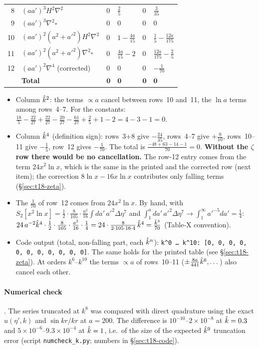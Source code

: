 {\begin{longtable}{@{}r l l l l l@{}}
8 & $(aa')^3H^2\nabla^2$ & 0 & $\tfrac25$ & 0 & $\tfrac3{35}$\\[2pt]
9 & $(aa')^3\nabla^2\square$ & 0 & 0 & 0 & 0\\
10 & $(aa')^2(a^2{+}a'^2)H^2\nabla^2$ & 0 & $1-\tfrac{4a}{15}$ & 0 & $\tfrac15-\tfrac{12a}{175}$\\[2pt]
11 & $(aa')^2(a^2{+}a'^2)\nabla^2\square$ & 0 & $\tfrac{4a}{15}-2$ & 0 & $\tfrac{12a}{175}-\tfrac25$\\[2pt]
12 & $(aa')^2\nabla^4$ (corrected) & 0 & 0 & 0 & $-\tfrac1{70}$\\
\midrule
 & \textbf{Total} & $\bm0$ & $\bm0$ & $\bm0$ & $\bm0$\\
\bottomrule
\end{longtable}
}
\begin{itemize}[leftmargin=14pt]
\item Column $\hat k^2$: the terms $\propto a$ cancel between rows~10 and~11, the $\ln a$ terms among rows~4--7. For the constants:
$\tfrac{18}5-\tfrac{22}{27}+\tfrac{22}{27}-\tfrac{20}{27}-\tfrac{61}{27}+\tfrac25+1-2=4-3-1=0$.
\item Column $\hat k^4$ (definition sign): rows~3+8 give $-\tfrac{24}{35}$, rows~4--7 give $+\tfrac{9}{10}$, rows~10--11 give $-\tfrac15$, row~12 gives $-\tfrac1{70}$.
The total is $\tfrac{-48+63-14-1}{70}=0$. \textbf{Without the $\zeta$ row there would be no cancellation.} The row-12 entry comes from the term
$24x^2\ln x$, which is the same in the printed and the corrected row (next item); the correction $8\ln x-16x\ln x$ contributes only falling terms (\S\ref{sec:t18-zeta}).
\item The $\tfrac1{70}$ of row~12 comes from $24x^2\ln x$. By hand, with $S_2[x^2\ln x]=\tfrac12\cdot\tfrac8{105}\cdot\tfrac{a^2}{16}\int da'\,a'^2\Delta\eta^7$ and
$\int_1^a da'\,a'^2\Delta\eta^7\to\int_1^\infty a'^{-5}da'=\tfrac14$:
$24\,a^{-2}\hat k^4\cdot\tfrac12\cdot\tfrac8{105}\cdot\tfrac{a^2}{16}\cdot\tfrac14=24\cdot\tfrac{8}{2\cdot105\cdot16\cdot4}\,\hat k^4=\tfrac{\hat k^4}{70}$ (Table-X convention).
\item Code output (total, non-falling part, each $\hat k^n$): \texttt{k\^{}0 \ldots{} k\^{}10: [0, 0, 0, 0, 0, 0, 0, 0, 0, 0, 0]}. The same holds for the printed table (see \S\ref{sec:t18-zeta}).
At orders $k^6$--$k^{10}$ the terms $\propto a$ of rows~10--11 ($\pm\frac{8a}{441}\hat k^6,\dots$) also cancel each other.
\end{itemize}

\paragraph{Numerical check} \tC. The series truncated at $k^8$ was compared with direct quadrature using the exact $u(\eta',k)$ and $\sin kr/kr$ at $a=200$.
The difference is $10^{-10}$--$2\times10^{-8}$ at $\hat k=0.3$ and $5\times10^{-6}$--$9.3\times10^{-4}$ at $\hat k=1$, i.e.\ of the size of the expected $\hat k^9$ truncation error
(script \texttt{numcheck\_k.py}; numbers in \S\ref{sec:t18-code}).

